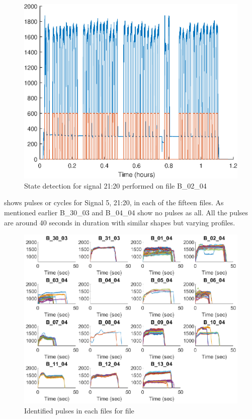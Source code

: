 \documentclass[]{article}
\begin{document}
\begin{figure}[H]
    \centering
    \includegraphics[scale=0.75]{figures/StateDetectionFig_B_02_04.eps}
    \caption{State detection for signal 21:20 performed on file B\_02\_04}
    \label{fig:StateDetectionFig_B_02_04}
\end{figure}

 shows pulses or cycles for Signal 5, 21:20, in each of the fifteen files. As mentioned earlier B\_30\_03 and B\_04\_04 show no pulses as all. All the pulses are around 40 seconds in duration with similar shapes but varying profiles.
 
\begin{figure}[H]
    \centering
    \includegraphics[width=\textwidth, height=\textheight, keepaspectratio]{figures/IdentifiedPulsesFig.eps}
    \caption{Identified pulses in each files for file}
    \label{fig:IdentifiedPulses}
\end{figure}
\end{document}

